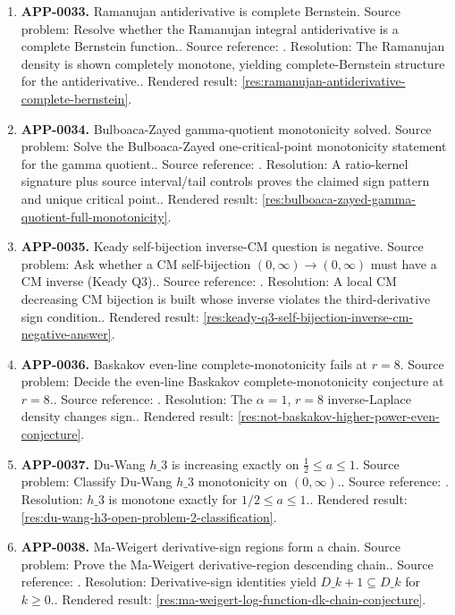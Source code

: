 \begin{enumerate}[leftmargin=*]
\item \textbf{APP-0033.} Ramanujan antiderivative is complete Bernstein.  Source problem: Resolve whether the Ramanujan integral antiderivative is a complete Bernstein function.. Source reference: \cite{mishra-swaminathan-ramanujan}. Resolution: The Ramanujan density is shown completely monotone, yielding complete-Bernstein structure for the antiderivative.. Rendered result: \ref{res:ramanujan-antiderivative-complete-bernstein}.
\item \textbf{APP-0034.} Bulboaca-Zayed gamma-quotient monotonicity solved.  Source problem: Solve the Bulboaca-Zayed one-critical-point monotonicity statement for the gamma quotient.. Source reference: \cite{app-app-0009-source}. Resolution: A ratio-kernel signature plus source interval/tail controls proves the claimed sign pattern and unique critical point.. Rendered result: \ref{res:bulboaca-zayed-gamma-quotient-full-monotonicity}.
\item \textbf{APP-0035.} Keady self-bijection inverse-CM question is negative.  Source problem: Ask whether a CM self-bijection \((0,\infty)\to(0,\infty)\) must have a CM inverse (Keady Q3).. Source reference: \cite{app-app-0035-source}. Resolution: A local CM decreasing CM bijection is built whose inverse violates the third-derivative sign condition.. Rendered result: \ref{res:keady-q3-self-bijection-inverse-cm-negative-answer}.
\item \textbf{APP-0036.} Baskakov even-line complete-monotonicity fails at \(r=8\).  Source problem: Decide the even-line Baskakov complete-monotonicity conjecture at \(r=8\).. Source reference: \cite{abel-gawronski-neuschel}. Resolution: The \(\alpha=1\), \(r=8\) inverse-Laplace density changes sign.. Rendered result: \ref{res:not-baskakov-higher-power-even-conjecture}.
\item \textbf{APP-0037.} Du-Wang \(h\_3\) is increasing exactly on \(\frac12\le a\le1\).  Source problem: Classify Du-Wang \(h\_3\) monotonicity on \((0,\infty)\).. Source reference: \cite{du-wang-h3}. Resolution: \(h\_3\) is monotone exactly for \(1/2\le a\le1\).. Rendered result: \ref{res:du-wang-h3-open-problem-2-classification}.
\item \textbf{APP-0038.} Ma-Weigert derivative-sign regions form a chain.  Source problem: Prove the Ma-Weigert derivative-region descending chain.. Source reference: \cite{ma-weigert-log-functions}. Resolution: Derivative-sign identities yield \(D\_{k+1}\subseteq D\_k\) for \(k\ge0\).. Rendered result: \ref{res:ma-weigert-log-function-dk-chain-conjecture}.

\end{enumerate}
